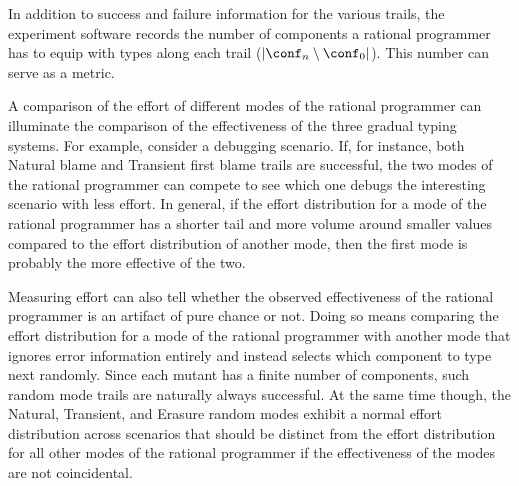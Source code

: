
In addition to success and failure information for the various trails, the
experiment software records the number of components a rational programmer has
to equip with types along each trail ($\lvert \conf_n \setminus \conf_0
\rvert$). This number can serve as a metric. 

A comparison of the effort of different modes of the rational programmer can
illuminate the comparison of the effectiveness of the three gradual typing
systems. For example, consider a debugging scenario.  If, for instance, both
Natural blame and Transient first blame trails are successful, the two modes of
the rational programmer can compete to see which one debugs the interesting
scenario with less effort. In general, if the effort distribution for a mode of
the rational programmer has a shorter tail and more volume around smaller values
compared to the effort distribution of another mode, then the first mode is
probably the more effective of the two.

Measuring effort can also tell whether the observed effectiveness of the
rational programmer is an artifact of pure chance or not.  Doing so means
comparing the effort distribution for a mode of the rational programmer with
another mode that ignores error information entirely and instead selects which
component to type next randomly.  Since each mutant has a finite number of
components, such random mode trails are naturally always successful. At the same
time though, the Natural, Transient, and Erasure random modes exhibit a normal
effort distribution across scenarios that should be distinct from the effort
distribution for all other modes of the rational programmer if the effectiveness
of the modes are not coincidental.





